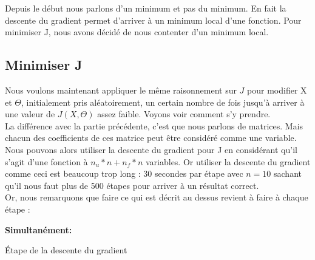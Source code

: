 \documentclass[a4paper,10pt]{article}
\begin{document}
Depuis le début nous parlons d'un minimum et pas du minimum. En fait la descente du gradient permet d'arriver à un minimum local d'une fonction. Pour minimiser J, nous avons décidé de nous contenter d'un minimum local.

\subsection{Minimiser J}

Nous voulons maintenant appliquer le même raisonnement sur $J$ pour modifier X et $\Theta$, initialement pris aléatoirement, un certain nombre de fois jusqu'à arriver à une valeur de $J(X, \Theta)$ assez faible. Voyons voir comment s'y prendre.\\

La différence avec la partie précédente, c'est que nous parlons de matrices. Mais chacun des coefficients de ces matrice peut être considéré comme une variable. Nous pouvons alors utiliser la descente du gradient pour J en considérant qu'il s'agit d'une fonction à $n_u * n + n_f * n$ variables. Or utiliser la descente du gradient comme ceci est beaucoup trop long : 30 secondes par étape avec $n = 10$ sachant qu'il nous faut plus de 500 étapes pour arriver à un résultat correct.\\

Or, nous remarquons que faire ce qui est décrit au dessus revient à faire à chaque étape :

\begin{algorithm}
\BlankLine
\textbf{Simultanément:}\\
\indent {}
\indent {}
\caption{Étape de la descente du gradient}
\end{algorithm}
\end{document}
